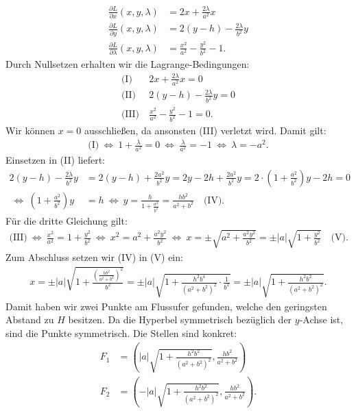 \begin{align*}
	\frac{\partial L}{\partial x} (x,y,\lambda)
	&=
	2x + \frac{2 \lambda}{a^2} x\\
	\frac{\partial L}{\partial y} (x,y,\lambda)
	&=
	2(y-h)- \frac{2 \lambda}{b^2} y\\
	\frac{\partial L}{\partial\lambda} (x,y,\lambda)
	&=
	\frac{x^2}{a^2} - \frac{y^2}{b^2} -1.
\end{align*}
Durch Nullsetzen erhalten wir die Lagrange-Bedingungen:
\begin{align*}
	\textrm{(I)} &\ 2x + \frac{2 \lambda}{a^2} x = 0 \\
	\textrm{(II)} &\ 2(y-h)- \frac{2 \lambda}{b^2} y = 0\\
	\textrm{(III)} &\ \frac{x^2}{a^2} - \frac{y^2}{b^2} -1 = 0.
\end{align*}
Wir können $ x = 0 $ ausschließen, da ansonsten (III) verletzt wird. Damit gilt:
\begin{align*}
	\textrm{(I)}
	\ \Leftrightarrow \
	1 + \frac{\lambda}{a^2} = 0
	\ \Leftrightarrow \
	\frac{\lambda}{a^2} = - 1
	\ \Leftrightarrow \
	\lambda = - a^2.
\end{align*}
Einsetzen in (II) liefert:
\begin{align*}
	2 (y-h ) - \frac{2\lambda}{b^2} y
	&=
	2(y-h) +
	\frac{2 a^2}{b^2} y
	=2 y - 2h  + \frac{2 a^2}{b^2} y
	=
	2 \cdot \left(1 +   \frac{a^2}{b^2} \right) y - 2h 
	 = 0 \\
	\ \Leftrightarrow \
	\left(1 +   \frac{a^2}{b^2} \right) y  &= h
	\ \Leftrightarrow \
	y = \frac{h}{1 +   \frac{a^2}{b^2} }
	=
	\frac{h b^2 }{a^2 + b^2} \quad \textrm{(IV)}.
\end{align*}
Für die dritte Gleichung gilt:
\begin{align*}
	\textrm{(III)}
	\ \Leftrightarrow \
	\frac{x^2}{a^2} = 1+  \frac{y^2}{b^2} 
	\ \Leftrightarrow \
	x^2 = a^2 + \frac{a^2 y^2 }{b^2}
	\ \Leftrightarrow \
	x = \pm \sqrt{a^2 + \frac{a^2 y^2 }{b^2}}
	=
	\pm |a|  \sqrt{1 + \frac{y^2}{b^2}} \quad \textrm{(V)}
	.
\end{align*}
Zum Abschluss setzen wir (IV) in (V) ein:
\begin{align*}
	x =
	\pm |a|
	\sqrt{1 + \frac{\left(\frac{h b^2 }{a^2 + b^2}\right)^2}{b^2}} 
	=
	\pm |a| 
	\sqrt{1 + \frac{h^2 b^4}{(a^2 + b^2)^2} \cdot \frac{1 }{b^2}}
	=
	\pm |a| 
	\sqrt{1 + \frac{h^2 b^2}{(a^2 + b^2)^2}}.
\end{align*}
Damit haben wir zwei Punkte am Flussufer gefunden, welche den geringsten Abstand zu $ H $ besitzen.
Da die Hyperbel symmetrisch bezüglich der $ y $-Achse ist, sind die Punkte symmetrisch.
Die Stellen sind konkret:
\begin{align*}
	F_1 &=
	\left(|a| 
	\sqrt{1 + \frac{h^2 b^2}{(a^2 + b^2)^2}},\frac{h b^2 }{a^2 + b^2}  \right)\\
	F_2 &=
	\left(-|a| 
	\sqrt{1 + \frac{h^2 b^2}{(a^2 + b^2)^2}},\frac{h b^2 }{a^2 + b^2}  \right).
\end{align*}

